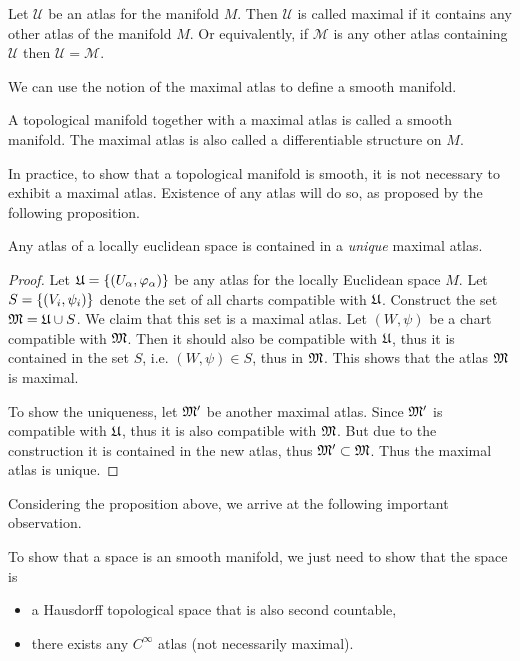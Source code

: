 \begin{definition}
	Let $ \mathcal{U} $ be an atlas for the manifold $ M $. Then $ \mathcal{U} $ is called maximal if it contains any other atlas of the manifold $ M $. Or equivalently, if $ \mathcal{M} $ is any other atlas containing $ \mathcal{U} $ then $ \mathcal{U} = \mathcal{M} $.
\end{definition}

We can use the notion of the maximal atlas to define a smooth manifold.

\begin{definition}
	A topological manifold together with a maximal atlas is called a smooth manifold. The maximal atlas is also called a differentiable structure on $ M $.
\end{definition}


In practice, to show that a topological manifold is smooth, it is not necessary to exhibit a maximal atlas. Existence of any atlas will do so, as proposed by the following proposition.


\begin{proposition}
	Any atlas of a locally euclidean space is contained in a \emph{unique} maximal atlas.
\end{proposition}

\begin{proof}
	Let $ \frak{U} = \{(U_\alpha, \varphi_\alpha)\} $ be any atlas for the locally Euclidean space $ M $. Let $ S = \{(V_i, \psi_i)\} $ denote the set of all charts compatible with $ \frak{U} $. Construct the set $ \frak{M} = \frak{U} \cup S $. We claim that this set is a maximal atlas. Let $ (W,\psi) $ be a chart compatible with $ \frak{M} $. Then it should also be compatible with $ \frak{U} $, thus it is contained in the set $ S $, i.e. $ (W,\psi) \in S $, thus in $ \frak{M} $. This shows that the atlas $ \frak{M} $ is maximal.
	
	To show the uniqueness, let $ \frak{M}' $ be another maximal atlas. Since $ \frak{M}' $ is compatible with $ \frak{U} $, thus it is also compatible with $ \frak{M} $. But due to the construction it is contained in the new atlas, thus $ \frak{M}' \subset \frak{M} $. Thus the maximal atlas is unique.
\end{proof}

Considering the proposition above, we arrive at the following important observation.

\begin{observation}
	To show that a space is an smooth manifold, we just need to show that the space is
	\begin{itemize}
		\item a Hausdorff topological space that is also second countable,
		\item there exists any $ C^\infty $ atlas (not necessarily maximal).
	\end{itemize}
\end{observation}



